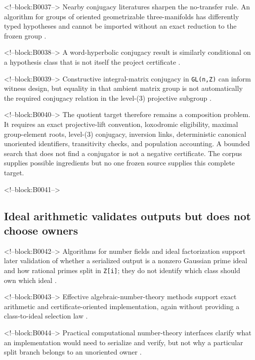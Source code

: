 \documentclass[11pt,a4paper]{article}
\begin{document}
<!--block:B0037-->
Nearby conjugacy literatures sharpen the no-transfer rule. An algorithm for groups of oriented geometrizable three-manifolds has differently typed hypotheses and cannot be imported without an exact reduction to the frozen group
\citep{P29-S12}.

<!--block:B0038-->
A word-hyperbolic conjugacy result is similarly conditional on a hypothesis class that is not itself the project certificate
\citep{P29-S13}.

<!--block:B0039-->
Constructive integral-matrix conjugacy in \texttt{GL(n,Z)} can inform witness design, but equality in that ambient matrix group is not automatically the required conjugacy relation in the level-(3) projective subgroup
\citep{P29-S14}.

<!--block:B0040-->
The quotient target therefore remains a composition problem. It requires an exact projective-lift convention, loxodromic eligibility, maximal group-element roots, level-(3) conjugacy, inversion links, deterministic canonical unoriented identifiers, transitivity checks, and population accounting. A bounded search that does not find a conjugator is not a negative certificate. The corpus supplies possible ingredients but no one frozen source supplies this complete target.

<!--block:B0041-->
\subsection{Ideal arithmetic validates outputs but does not choose owners}

<!--block:B0042-->
Algorithms for number fields and ideal factorization support later validation of whether a serialized output is a nonzero Gaussian prime ideal and how rational primes split in \texttt{Z{[}i{]}}; they do not identify which class should own which ideal
\citep{P29-S19}.

<!--block:B0043-->
Effective algebraic-number-theory methods support exact arithmetic and certificate-oriented implementation, again without providing a class-to-ideal selection law
\citep{P29-S20}.

<!--block:B0044-->
Practical computational number-theory interfaces clarify what an implementation would need to serialize and verify, but not why a particular split branch belongs to an unoriented owner
\citep{P29-S21}.
\end{document}
